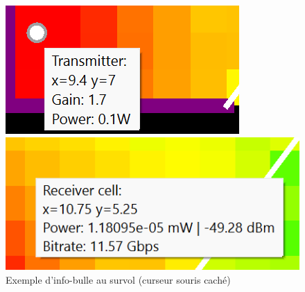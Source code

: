 \begin{figure}[H]
  \centering
  \begin{minipage}{0.4\textwidth}
    \includegraphics[width=\textwidth]{latex/images/tooltip.png}
  \end{minipage}
  \hfill
  \begin{minipage}{0.49\textwidth}
    \includegraphics[width=\textwidth]{latex/images/tooltip2.png}
  \end{minipage}
  \caption{Exemple d'info-bulle au survol (curseur souris caché)}
  \label{fig:tooltips}
\end{figure}

